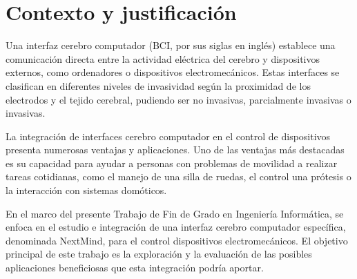 \section{Contexto y justificación}

Una interfaz cerebro computador (BCI, por sus siglas en inglés) establece una comunicación directa entre la actividad eléctrica del cerebro y dispositivos externos, como ordenadores o dispositivos electromecánicos. Estas interfaces se clasifican en diferentes niveles de invasividad según la proximidad de los electrodos y el tejido cerebral, pudiendo ser no invasivas, parcialmente invasivas o invasivas.

La integración de interfaces cerebro computador en el control de dispositivos presenta numerosas ventajas y aplicaciones. Uno de las ventajas más destacadas es su capacidad para ayudar a personas con problemas de movilidad a realizar tareas cotidianas, como el manejo de una silla de ruedas, el control una prótesis o la interacción con sistemas domóticos.

En el marco del presente Trabajo de Fin de Grado en Ingeniería Informática, se enfoca en el estudio e integración de una interfaz cerebro computador específica, denominada NextMind, para el control dispositivos electromecánicos. El objetivo principal de este trabajo es la exploración y la evaluación de las posibles aplicaciones beneficiosas que esta integración podría aportar.
